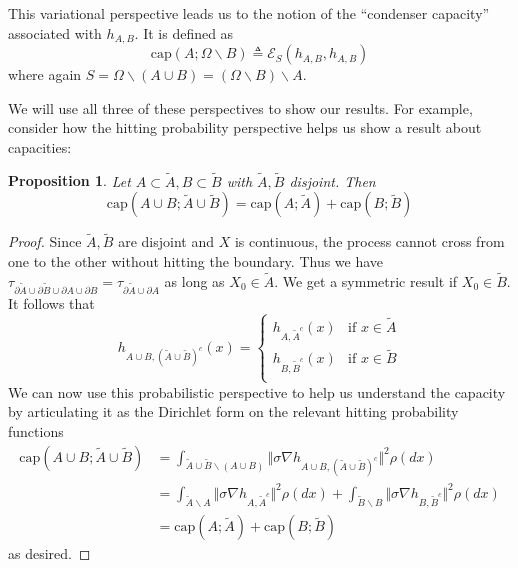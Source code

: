 \documentclass[english, aip, jcp, priprint, graphicx,floatfix]{revtex4-1}
\newtheorem{proposition}{Proposition}
\theoremstyle{plain}
\theoremstyle{definition}
\theoremstyle{plain}
\newcommand{\capac}[2]{\mathrm{cap}\left(#1;#2\right)}
\begin{document}
\begin{enumerate}
    This variational perspective leads us to the notion of the ``condenser capacity'' associated with $h_{A,B}$.  It is defined as 
    \[
    \capac{A}{\Omega \backslash B} \triangleq \mathscr{E}_S(h_{A,B},h_{A,B})
    \]
    where again $S=\Omega \backslash (A\cup B)=(\Omega \backslash B) \backslash A$.  
\end{enumerate}


  We will use all three of these perspectives to show our results.  For example, consider how the hitting probability perspective helps us show a result about capacities:

\begin{proposition}\label{prop:capacity}
Let $A\subset \tilde A,B\subset \tilde B$ with $\tilde A,\tilde B$ disjoint.  Then 
\[
\capac{A\cup B}{\tilde A \cup \tilde B}=\capac{A}{\tilde A}+\capac{B}{\tilde B}
\]
\end{proposition}
\begin{proof}
Since $\tilde A,\tilde B$ are disjoint and $X$ is continuous, the process cannot cross from one to the other without hitting the boundary.  Thus we have $\tau_{\partial \tilde A\cup \partial \tilde B \cup \partial A \cup \partial B}=\tau_{\partial \tilde A \cup \partial A}$ as long as $X_0\in\tilde A$.  We get a symmetric result if $X_0\in \tilde B$.  It follows that
\[
h_{A\cup B,(\tilde A\cup\tilde B)^c}(x) = 
    \begin{cases}
    h_{A,\tilde A^c}(x) & \mbox{if }x\in \tilde A\\
    h_{B,\tilde B^c}(x) & \mbox{if }x\in \tilde B\\
    \end{cases}
\]
We can now use this probabilistic perspective to help us understand the capacity by articulating it as the Dirichlet form on the relevant hitting probability functions
\begin{align*}
\capac{A\cup B}{\tilde A \cup \tilde B} 
        &= \int_{\tilde A\cup \tilde B \backslash (A\cup B)} \Vert \sigma \nabla h_{A\cup B,(\tilde A \cup \tilde B)^c}\Vert^2\rho(dx) \\
        &= \int_{\tilde A \backslash A} \Vert \sigma \nabla h_{A,\tilde A^c}\Vert^2\rho(dx)
            +\int_{\tilde B \backslash B} \Vert \sigma \nabla h_{B,\tilde B^c}\Vert^2 \rho(dx) \\
        &= \capac{A}{\tilde A}+\capac{B}{\tilde B}
\end{align*}
as desired.
\end{proof}


                                                       
\end{document}
